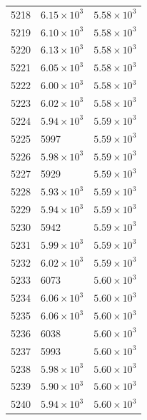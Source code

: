 \begin{table}[H]
\begin{tabular}{lll}
5218 & $\displaystyle 6.15 \times 10^{3}$ & $\displaystyle 5.58 \times 10^{3}$ \\
5219 & $\displaystyle 6.10 \times 10^{3}$ & $\displaystyle 5.58 \times 10^{3}$ \\
5220 & $\displaystyle 6.13 \times 10^{3}$ & $\displaystyle 5.58 \times 10^{3}$ \\
5221 & $\displaystyle 6.05 \times 10^{3}$ & $\displaystyle 5.58 \times 10^{3}$ \\
5222 & $\displaystyle 6.00 \times 10^{3}$ & $\displaystyle 5.58 \times 10^{3}$ \\
5223 & $\displaystyle 6.02 \times 10^{3}$ & $\displaystyle 5.58 \times 10^{3}$ \\
5224 & $\displaystyle 5.94 \times 10^{3}$ & $\displaystyle 5.59 \times 10^{3}$ \\
5225 & 5997 & $\displaystyle 5.59 \times 10^{3}$ \\
5226 & $\displaystyle 5.98 \times 10^{3}$ & $\displaystyle 5.59 \times 10^{3}$ \\
5227 & 5929 & $\displaystyle 5.59 \times 10^{3}$ \\
5228 & $\displaystyle 5.93 \times 10^{3}$ & $\displaystyle 5.59 \times 10^{3}$ \\
5229 & $\displaystyle 5.94 \times 10^{3}$ & $\displaystyle 5.59 \times 10^{3}$ \\
5230 & 5942 & $\displaystyle 5.59 \times 10^{3}$ \\
5231 & $\displaystyle 5.99 \times 10^{3}$ & $\displaystyle 5.59 \times 10^{3}$ \\
5232 & $\displaystyle 6.02 \times 10^{3}$ & $\displaystyle 5.59 \times 10^{3}$ \\
5233 & 6073 & $\displaystyle 5.60 \times 10^{3}$ \\
5234 & $\displaystyle 6.06 \times 10^{3}$ & $\displaystyle 5.60 \times 10^{3}$ \\
5235 & $\displaystyle 6.06 \times 10^{3}$ & $\displaystyle 5.60 \times 10^{3}$ \\
5236 & 6038 & $\displaystyle 5.60 \times 10^{3}$ \\
5237 & 5993 & $\displaystyle 5.60 \times 10^{3}$ \\
5238 & $\displaystyle 5.98 \times 10^{3}$ & $\displaystyle 5.60 \times 10^{3}$ \\
5239 & $\displaystyle 5.90 \times 10^{3}$ & $\displaystyle 5.60 \times 10^{3}$ \\
5240 & $\displaystyle 5.94 \times 10^{3}$ & $\displaystyle 5.60 \times 10^{3}$ \\

\end{tabular}
\end{table}
